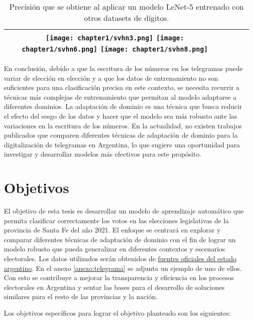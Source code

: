 \begin{table}[H]
\begin{tabular}{c|ccc}
        \texttt{[image: chapter1/svhn3.png]}
        \texttt{[image: chapter1/svhn6.png]}
        \texttt{[image: chapter1/svhn8.png]}                              &                                                   &                                   &                                   \\
        \bottomrule
    \end{tabular}
    \caption{Precisión que se obtiene al aplicar un modelo LeNet-5 entrenado con otros datasets de dígitos.}
    \label{tab:lenet-distintos-datasets}
\end{table}

En conclusión, debido a que la escritura de los números en los telegramas puede variar de elección en elección y a que
los datos de entrenamiento no son suficientes para una clasificación precisa en este contexto, se necesita recurrir a
técnicas más complejas de entrenamiento que permitan al modelo adaptarse a diferentes dominios. La adaptación de
dominio es una técnica que busca reducir el efecto del sesgo de los datos y hacer que el modelo sea más robusto ante
las variaciones en la escritura de los números. En la actualidad, no existen trabajos publicados que comparen
diferentes técnicas de adaptación de dominio para la digitalización de telegramas en Argentina, lo que sugiere una
oportunidad para investigar y desarrollar modelos más efectivos para este propósito.

\section{Objetivos}

El objetivo de esta tesis es desarrollar un modelo de aprendizaje automático que permita clasificar correctamente los
votos en las elecciones legislativas de la provincia de Santa Fe del año 2021. El enfoque se centrará en explorar y
comparar diferentes técnicas de adaptación de dominio con el fin de lograr un modelo robusto que pueda generalizar en
diferentes contextos y escenarios electorales. Los datos utilizados serán obtenidos de
\href{https://op.elecciones.gob.ar/telegramas/generales2021/}{fuentes oficiales del estado argentino}. En el anexo
\ref{anexo:telegrama} se adjunta un ejemplo de uno de ellos. Con esto se contribuye a mejorar la transparencia y
eficiencia en los procesos electorales en Argentina y sentar las bases para el desarrollo de soluciones similares para
el resto de las provincias y la nación.

Los objetivos específicos para lograr el objetivo planteado son los siguientes:

